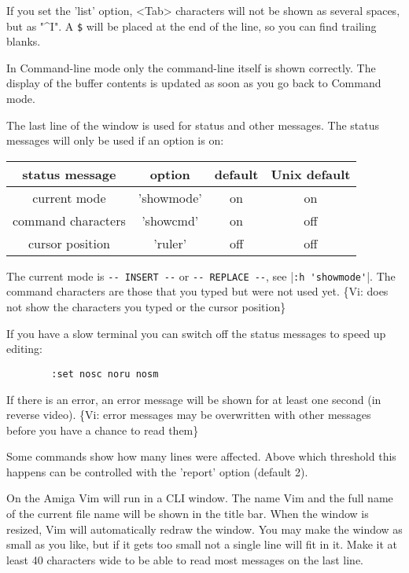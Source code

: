 If you set the 'list' option, <Tab> characters will not be shown as several spaces, but as "\textasciicircum I".
A \verb!$! will be placed at the end of the line, so you can find trailing blanks.

In Command-line mode only the command-line itself is shown correctly.
The display of the buffer contents is updated as soon as you go back to Command mode.

The last line of the window is used for status and other messages.
The status messages will only be used if an option is on:
\begin{center}
				\begin{tabular}{|c|c|c|c|}
								\hline
								status message     & option     & default & Unix default\\ \hline
								current mode       & 'showmode' & on      & on\\ \hline
								command characters & 'showcmd'  & on      & off\\ \hline
								cursor position    & 'ruler'    & off     & off\\ \hline
				\end{tabular}
\end{center}

The current mode is \verb"-- INSERT --" or \verb"-- REPLACE --", see |\verb!:h 'showmode'!|.
The command characters are those that you typed but were not used yet.
\{Vi: does not show the characters you typed or the cursor position\}

If you have a slow terminal you can switch off the status messages to speed up editing:
		\begin{verbatim}
		:set nosc noru nosm
		\end{verbatim}

If there is an error, an error message will be shown for at least one second (in reverse video).
\{Vi: error messages may be overwritten with other messages before you have a chance to read them\}

Some commands show how many lines were affected.
Above which threshold this happens can be controlled with the 'report' option (default 2).

On the Amiga Vim will run in a CLI window.
The name Vim and the full name of the current file name will be shown in the title bar.
When the window is resized, Vim will automatically redraw the window.
You may make the window as small as you like, but if it gets too small not a single line will fit in it.
Make it at least 40 characters wide to be able to read most messages on the last line.

